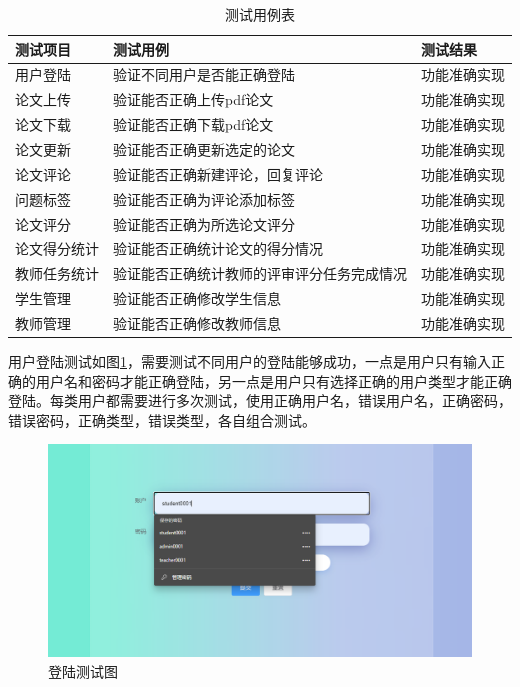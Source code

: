 \begin{table}[htbp]
  \centering
  \song\wuhao
  \caption{ 测试用例表 }
  \label{test-usecase-table}
  \begin{tabular}{|l|l|l|}
    \hline
    测试项目     & 测试用例                                   & 测试结果     \\ \hline
    用户登陆     & 验证不同用户是否能正确登陆                 & 功能准确实现 \\ \hline
    论文上传     & 验证能否正确上传pdf论文                    & 功能准确实现 \\ \hline
    论文下载     & 验证能否正确下载pdf论文                    & 功能准确实现 \\ \hline
    论文更新     & 验证能否正确更新选定的论文                 & 功能准确实现 \\ \hline
    论文评论     & 验证能否正确新建评论，回复评论             & 功能准确实现 \\ \hline
    问题标签     & 验证能否正确为评论添加标签                 & 功能准确实现 \\ \hline
    论文评分     & 验证能否正确为所选论文评分                 & 功能准确实现 \\ \hline
    论文得分统计 & 验证能否正确统计论文的得分情况             & 功能准确实现 \\ \hline
    教师任务统计 & 验证能否正确统计教师的评审评分任务完成情况 & 功能准确实现 \\ \hline
    学生管理     & 验证能否正确修改学生信息                   & 功能准确实现 \\ \hline
    教师管理     & 验证能否正确修改教师信息                   & 功能准确实现 \\ \hline
  \end{tabular}
\end{table}

用户登陆测试如图\ref{login-test}，需要测试不同用户的登陆能够成功，一点是用户只有输入正确的用户名和密码才能正确登陆，另一点是用户只有选择正确的用户类型才能正确登陆。每类用户都需要进行多次测试，使用正确用户名，错误用户名，正确密码，错误密码，正确类型，错误类型，各自组合测试。

\begin{figure}[htbp]
  \centering
  \includegraphics[scale = 0.57]{out/figure/测试/login-test.png}
  \caption{\song\wuhao 登陆测试图}
  \label{login-test}
\end{figure}

